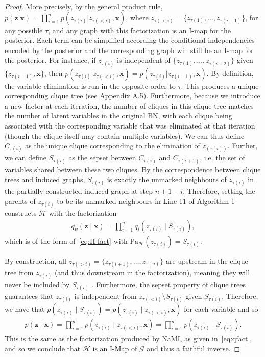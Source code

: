 \begin{proof}
More precisely, by the general product rule, 
$p(\mathbf{z}|\mathbf{x})=\prod^n_{i=1}p(z_{\tau(i)}|z_{\tau(<i)},\mathbf{x})$,
where $z_{\tau(<i)}=\{z_{\tau(1)},\ldots,z_{\tau(i-1)}\}$,
for any possible $\tau$,
and any graph with this factorization is an I-map for the posterior. Each term can be simplified according the conditional independencies encoded by the posterior and the corresponding graph will still be an I-map for the posterior. For instance, if $z_{\tau(i)}$ is independent of $\{z_{\tau(1)}, \ldots,z_{\tau(i-2)}\}$ given $\{z_{\tau(i-1)},\mathbf{x}\}$, then $p(z_{\tau(i)}|z_{\tau(<i)},\mathbf{x})=p(z_{\tau(i)}|z_{\tau(i-1)},\mathbf{x})$. %
By definition, the variable elimination is run in the opposite order to $\tau$.
This produces a unique corresponding
clique tree (see Appendix A.5). Furthermore, because we introduce a new factor at each iteration, the
number of cliques in this clique tree matches the number of latent variables in the original BN, with each
clique being associated with the corresponding variable that was eliminated at that iteration (though the
clique itself may contain multiple variables).  We can thus define $C_{\tau(i)}$ as the unique clique
corresponding to the elimination of $z_{(\tau(i))}$.  Further, we can define $S_{\tau(i)}$ as the sepset between
$C_{\tau(i)}$ and $C_{\tau(i+1)}$, i.e. the set of variables shared between these two cliques.
By the correspondence between clique trees and induced graphs, $S_{\tau(i)}$ is exactly the unmarked neighbours of $z_{\tau(i)}$ in the partially constructed induced graph at step $n+1-i$.  
Therefore, setting the parents of $z_{\tau(i)}$ to be its unmarked neighbours in Line 11 of Algorithm 1 constructs $\mathcal{H}$ with the factorization
\begin{align}
\label{eq:qfact}
q_\psi(\mathbf{z}\mid\mathbf{x})=\prod_{i=1}^{n} q_{i}(z_{\tau(i)}\mid S_{\tau(i)}),
\end{align}
which is of the form of~\eqref{eq:H-fact} with $\text{Pa}_\mathcal{H}(z_{\tau(i)})=S_{\tau(i)}$.

By construction, all $z_{\tau(>i)}=\{z_{\tau(i+1)},\ldots,z_{\tau(n)}\}$ 
are upstream in the clique tree from $z_{\tau(i)}$ (and thus downstream in the factorization), meaning they
will never be included by $S_{\tau(i)}$ .  Furthermore, the sepset property of
clique trees \citep[Theorem 10.2]{KollerFriedman2009} guarantees that
 $z_{\tau(i)}$ is independent from $z_{\tau(<i)}\setminus S_{\tau(i)}$ given $S_{\tau(i)}$.
Therefore, we have that $p(z_{\tau(i)}\mid S_{\tau(i)})=p(z_{\tau(i)}\mid z_{\tau(<i)},\mathbf{x})$ for
each variable and so
\begin{align}
p(\mathbf{z}\mid\mathbf{x})=\prod^n_{i=1}p(z_{\tau(i)}\mid z_{\tau(<i)},\mathbf{x})=\prod^n_{i=1}p(z_{\tau(i)}\mid S_{\tau(i)}).
\end{align}
This is the same as the factorization produced by NaMI, as given in~\eqref{eq:qfact}, and so we conclude
that $\mathcal{H}$ is an I-Map of $\mathcal{G}$ and thus a faithful inverse.


\end{proof}
